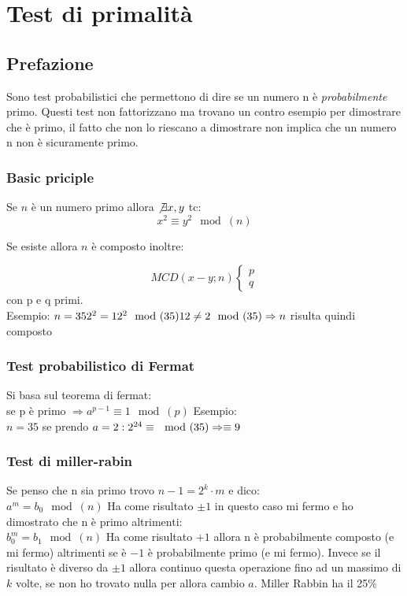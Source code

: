 \documentclass[10pt,a4paper]{article}
\begin{document}
\section{Test di primalità}
\subsection{Prefazione}
Sono test probabilistici che permettono di dire se un numero n è \textit{probabilmente} primo. Questi test non fattorizzano ma trovano un contro esempio per dimostrare che è primo, il fatto che non lo riescano a dimostrare non implica che un numero n non è sicuramente primo.

\subsubsection{Basic priciple}
Se $n$ è un numero primo allora $\not \exists x,y$ tc:
$$x^2\equiv y^2 \mod(n)$$

Se esiste allora $n$ è composto inoltre:

$$MCD(x-y;n)
\begin{cases}
p\\q
\end{cases}
$$
con p e q primi.\\
Esempio:
$n=35\\
2^2=12^2 \mod(35)\\
12 \not = 2 \mod(35) \Rightarrow n$ risulta quindi composto\\

\subsubsection{Test probabilistico di Fermat}
Si basa sul teorema di fermat:\\
se p è primo $\Rightarrow a^{p-1}\equiv 1 \mod(p)$
Esempio:\\
$n=35$ se prendo $a=2:\\
2^{24}\equiv \mod(35) \Rightarrow \equiv 9
$
\subsubsection{Test di miller-rabin}
Se penso che n sia primo trovo $n-1=2^k\cdot m$ e dico:\\
$a^m=b_0 \mod(n)$ Ha come risultato $ \pm 1$ in questo caso mi fermo e ho dimostrato che n è primo altrimenti:\\
$b_0^m=b_1 \mod(n)$ Ha come risultato $+1$ allora n è probabilmente composto (e mi fermo) altrimenti se è $-1$ è probabilmente primo (e mi fermo). Invece se il risultato è diverso da $\pm 1$ allora continuo questa operazione fino ad un massimo di $k$ volte, se non ho trovato nulla per allora cambio $a$. Miller Rabbin ha il 25\%
 
\end{document}
